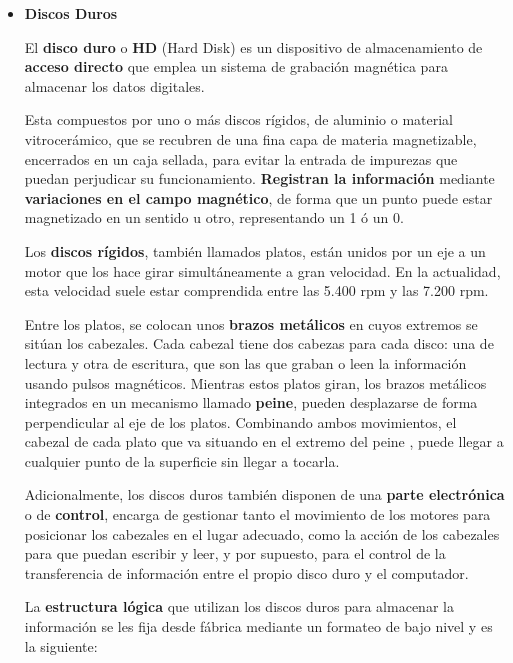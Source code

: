 \begin{itemize}
\begin{itemize}
     \item \textbf{Discos Duros}

     El \textbf{disco duro} o \textbf{HD} (Hard Disk) es un dispositivo de almacenamiento de \textbf{acceso directo} que emplea un sistema de grabación magnética para almacenar los datos digitales.

     Esta compuestos por uno o más discos rígidos, de aluminio o material vitrocerámico, que se recubren de una fina capa de materia magnetizable, encerrados en un caja sellada, para evitar la entrada de impurezas que puedan perjudicar su funcionamiento. \textbf{Registran la información} mediante \textbf{variaciones en el campo magnético}, de forma que un punto puede estar magnetizado en un sentido u otro, representando un 1 ó un 0.

     Los \textbf{discos rígidos}, también llamados platos, están unidos por un eje a un motor que los hace girar simultáneamente a gran velocidad. En la actualidad, esta velocidad suele estar comprendida entre las 5.400 rpm y las 7.200 rpm.

     Entre los platos, se colocan unos \textbf{brazos metálicos} en cuyos extremos se sitúan los cabezales. Cada cabezal tiene dos cabezas para cada disco: una de lectura y otra de escritura, que son las que graban o leen la información usando pulsos magnéticos. Mientras estos platos giran, los brazos metálicos integrados en un mecanismo llamado \textbf{peine}, pueden desplazarse de forma perpendicular al eje de los platos. Combinando ambos movimientos, el cabezal de cada plato que va situando en el extremo del peine , puede llegar a cualquier punto de la superficie sin llegar a tocarla.

     Adicionalmente, los discos duros también disponen de una \textbf{parte electrónica} o de \textbf{control}, encarga de gestionar tanto el movimiento de los motores para posicionar los cabezales en el lugar adecuado, como la acción de los cabezales para que puedan escribir y leer, y por supuesto, para el control de la transferencia de información entre el propio disco duro y el computador.

     La \textbf{estructura lógica} que utilizan los discos duros para almacenar la información se les fija desde fábrica mediante un formateo de bajo nivel y es la siguiente:


\end{itemize}
\end{itemize}
